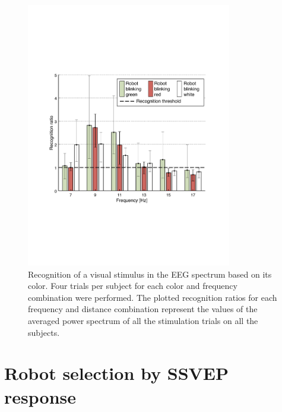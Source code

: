 \documentclass[smallextended]{svjour3}
\begin{document}
\begin{figure}
\center
\includegraphics[width=0.8\textwidth]{figures/color-v2.pdf}
\caption{Recognition of a visual stimulus in the EEG spectrum based on its color. Four trials per subject for each color and frequency combination were performed. The plotted recognition ratios for each frequency and distance combination represent the values of the averaged power spectrum of all the stimulation trials on all the subjects.} \label{fig:graph-couleurs}
\end{figure}

\section{Robot selection by SSVEP response}
\label{sec:CCA_approach}
\end{document}
